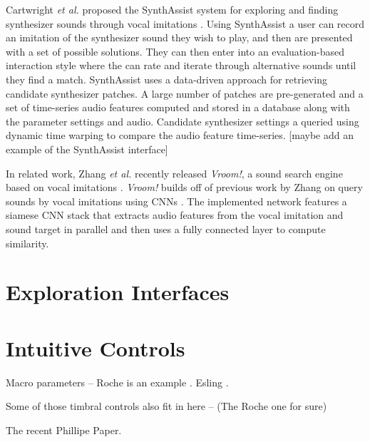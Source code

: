 Cartwright \textit{et al.} proposed the SynthAssist system for exploring and finding synthesizer sounds through vocal imitations \cite{cartwright2014synthassist}. Using SynthAssist a user can record an imitation of the synthesizer sound they wish to play, and then are presented with a set of possible solutions. They can then enter into an evaluation-based interaction style where the can rate and iterate through alternative sounds until they find a match. SynthAssist uses a data-driven approach for retrieving candidate synthesizer patches. A large number of patches are pre-generated and a set of time-series audio features computed and stored in a database along with the parameter settings and audio. Candidate synthesizer settings a queried using dynamic time warping to compare the audio feature time-series. [maybe add an example of the SynthAssist interface]

In related work, Zhang \textit{et al.} recently released \textit{Vroom!}, a sound search engine based on vocal imitations \cite{zhang2020vroom}. \textit{Vroom!} builds off of previous work by Zhang on query sounds by vocal imitations using CNNs \cite{zhang2017iminet, zhang2018visualization}. The implemented network features a siamese CNN stack that extracts audio features from the vocal imitation and sound target in parallel and then uses a fully connected layer to compute similarity.

\section{Exploration Interfaces}




\section{Intuitive Controls}

Macro parameters -- Roche is an example \cite{roche2021make}. Esling \cite{esling2019universal}. 

Some of those timbral controls also fit in here -- (The Roche one for sure) 

The recent Phillipe Paper.

 

